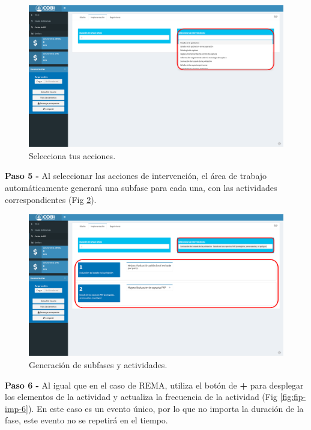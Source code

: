 \documentclass[
]{book}
\begin{document}
\begin{figure}
\includegraphics[width=61.11in]{images/fip-imp-4} \caption{Selecciona tus acciones.}\label{fig:fip-imp-4}
\end{figure}

\textbf{Paso 5 - } Al seleccionar las acciones de intervención, el área de trabajo automáticamente generará una subfase para cada una, con las actividades correspondientes (Fig \ref{fig:fip-imp-5}).

\begin{figure}
\includegraphics[width=61.11in]{images/fip-imp-5} \caption{Generación de subfases y actividades.}\label{fig:fip-imp-5}
\end{figure}

\textbf{Paso 6 - } Al igual que en el caso de REMA, utiliza el botón de \textbf{+} para desplegar los elementos de la actividad y actualiza la frecuencia de la actividad (Fig \ref{fig:fip-imp-6}). En este caso es un evento único, por lo que no importa la duración de la fase, este evento no se repetirá en el tiempo.
\end{document}
